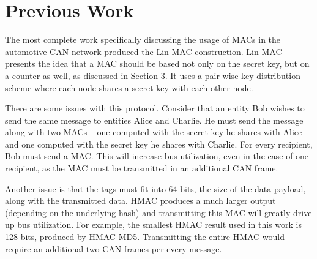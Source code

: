 \section{Previous Work}
The most complete work specifically discussing the usage of MACs in the automotive CAN network produced the Lin-MAC construction\cite{Lin-MAC}. Lin-MAC presents the idea that a MAC should be based not only on the secret key, but on a counter as well, as discussed in Section 3. It uses a pair wise key distribution scheme where each node shares a secret key with each other node.


There are some issues with this protocol. Consider that an entity Bob wishes to send the same message to entities Alice and Charlie. He must send the message along with two MACs -- one computed with the secret key he shares with Alice and one computed with the secret key he shares with Charlie. For every recipient, Bob must send a MAC. This will increase bus utilization, even in the case of one recipient, as the MAC must be transmitted in an additional CAN frame.

Another issue is that the tags must fit into 64 bits, the size of the data payload, along with the transmitted data. HMAC produces a much larger output (depending on the underlying hash) and transmitting this MAC will greatly drive up bus utilization. For example, the smallest HMAC result used in this work is 128 bits, produced by HMAC-MD5. Transmitting the entire HMAC would require an additional two CAN frames per every message.



